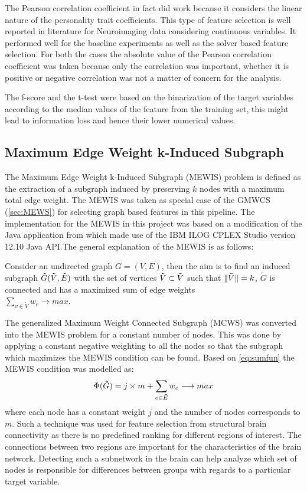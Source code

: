 \documentclass[msthesis.tex]{subfiles}
\begin{document}
The Pearson correlation coefficient in fact did work because it considers the linear nature of the personality trait coefficients. This type of feature selection is well reported in literature for Neuroimaging data considering continuous variables. It performed well for the baseline experiments as well as the solver based feature selection. For both the cases the absolute value of the Pearson correlation coefficient was taken because only the correlation was important, whether it is positive or negative correlation was not a matter of concern for the analysis.

The f-score and the t-test were based on the binarization of the target variables according to the median values of the feature from the training set, this might lead to information loss and hence their lower numerical values. 
\fi

\subsection{Maximum Edge Weight k-Induced Subgraph}
\label{method:MEWS}

The Maximum Edge Weight k-Induced Subgraph (MEWIS) problem is defined as the extraction of a subgraph induced by preserving $k$ nodes with a maximum total edge weight. The \gls{MEWIS} was taken as special case of the \gls{GMWCS} (\autoref{sec:MEWS}) for selecting graph based features in this pipeline. The implementation for the \gls{MEWIS} in this project was based on a modification of the Java application from \cite{DBLP:journals/corr/LobodaAS16} which made use of the IBM ILOG CPLEX Studio version 12.10 Java \gls{API}.The general explanation of the \gls{MEWIS} is as follows:

Consider an undirected graph $G=(V,E)$, then the aim is to find an induced subgraph $\tilde{G} (\Tilde{V}, \Tilde{E})$ with the set of vertices $\Tilde{V} \subset \Tilde{V}$ such that $\|\Tilde{V}\| = k$, $\tilde{G}$ is connected and has a maximized sum of edge weights \\ $\sum_{v \in \tilde{V}} w_e \longrightarrow max$. 

The generalized Maximum Weight Connected Subgraph (MCWS) was converted into the \gls{MEWIS} problem for a constant number of nodes. This was done by applying a constant negative weighting to all the nodes so that the subgraph which maximizes the \gls{MEWIS} condition can be found. Based on \cref{eq:sumfun} the \gls{MEWIS} condition was modelled as:
\begin{equation}
    \label{eq:sumews}
    \Phi (\Tilde{G}) = j \times m + \sum_{e \in \Tilde{E}} w_e \longrightarrow max \\
\end{equation}
where each node has a constant weight $j$ and the number of nodes corresponds to $m$. Such a technique was used for feature selection from structural brain connectivity as there is no predefined ranking for different regions of interest. The connections between two regions are important for the characteristics of the brain network. Detecting such a subnetwork in the brain can help analyze which set of nodes is responsible for differences between groups with regards to a particular target variable. 
\end{document}
